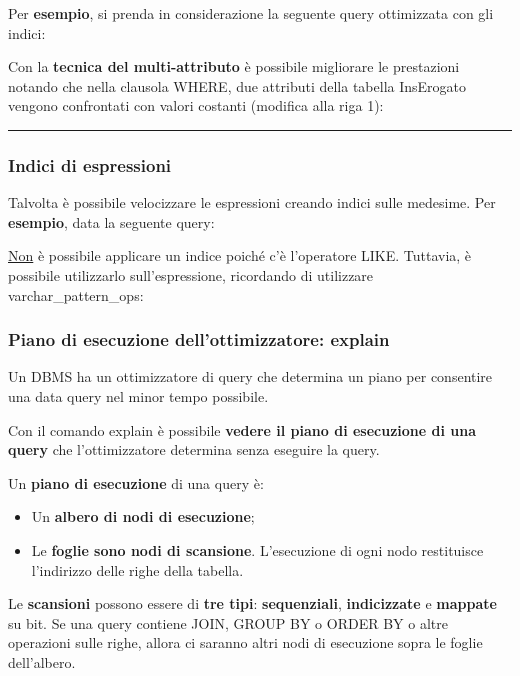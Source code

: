 \documentclass[a4paper]{article}
\newcommand{\longline}{\noindent\rule{\textwidth}{0.4pt}}
\begin{document}
	\noindent
	Per \textcolor{Green4}{\textbf{esempio}}, si prenda in considerazione la seguente query ottimizzata con gli indici:
	
	Con la \textbf{tecnica del multi-attributo} è possibile migliorare le prestazioni notando
	che nella clausola \textsf{WHERE}, due attributi della tabella \textsf{InsErogato} vengono confrontati
	con valori costanti (modifica alla riga 1):
	

	\longline

	\subsubsection{Indici di espressioni}

	Talvolta è possibile velocizzare le espressioni creando indici sulle medesime. Per \textcolor{Green4}{\textbf{esempio}}, data la seguente query:
	
	\underline{Non} è possibile applicare un indice poiché c'è l'operatore \textsf{LIKE}. Tuttavia, è possibile utilizzarlo sull'espressione, ricordando di utilizzare \textsf{varchar\_pattern\_ops}:
	\newpage

	\subsubsection{Piano di esecuzione dell'ottimizzatore: \textsf{explain}}

	Un DBMS ha un ottimizzatore di query che determina un piano per consentire una data query nel minor tempo possibile.
	
	Con il comando \textcolor{Red3}{\textsf{explain}} è possibile \textbf{vedere il piano di esecuzione di una query} che l'ottimizzatore determina senza eseguire la query.\newline

	\noindent
	Un \textbf{piano di esecuzione} di una query è:
	\begin{itemize}
		\item Un \textbf{albero di nodi di esecuzione};
		\item Le \textbf{foglie sono nodi di scansione}. L'esecuzione di ogni nodo restituisce l'indirizzo delle righe della tabella.
	\end{itemize}
	
	\noindent
	Le \textbf{scansioni} possono essere di \textbf{tre tipi}: \textbf{sequenziali}, \textbf{indicizzate} e \textbf{mappate} su bit. Se una query contiene \textsf{JOIN}, \textsf{GROUP BY} o \textsf{ORDER BY} o altre operazioni sulle righe, allora ci saranno altri nodi di esecuzione sopra le foglie dell'albero.\newline
\end{document}
